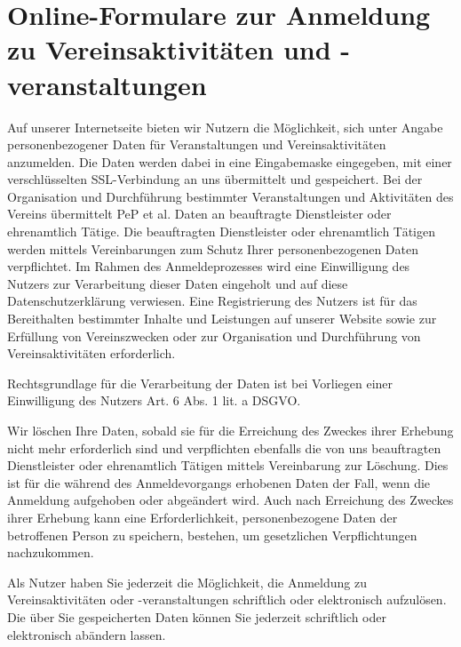 \documentclass[
  fontsize=12pt,
  paper=a4,
  DIV14,
  parskip,
]{scrartcl}
\begin{document}
\section{Online-Formulare zur Anmeldung zu Vereinsaktivitäten und -veranstaltungen}

Auf unserer Internetseite bieten wir Nutzern die Möglichkeit, sich unter
Angabe personenbezogener Daten für Veranstaltungen und Vereinsaktivitäten
anzumelden.
Die Daten werden dabei in eine Eingabemaske eingegeben, mit einer
verschlüsselten SSL-Verbindung an uns übermittelt und gespeichert.
Bei der Organisation und Durchführung bestimmter Veranstaltungen und
Aktivitäten des Vereins übermittelt PeP et al. Daten an beauftragte
Dienstleister oder ehrenamtlich Tätige.
Die beauftragten Dienstleister oder ehrenamtlich Tätigen werden mittels
Vereinbarungen zum Schutz Ihrer personenbezogenen Daten verpflichtet.
Im Rahmen des Anmeldeprozesses wird eine Einwilligung des Nutzers zur
Verarbeitung dieser Daten eingeholt und auf diese Datenschutzerklärung
verwiesen.
Eine Registrierung des Nutzers ist für das Bereithalten bestimmter Inhalte
und Leistungen auf unserer Website sowie zur Erfüllung von Vereinszwecken
oder zur Organisation und Durchführung von Vereinsaktivitäten erforderlich.

Rechtsgrundlage für die Verarbeitung der Daten ist bei Vorliegen einer
Einwilligung des Nutzers Art. 6 Abs. 1 lit. a DSGVO.

Wir löschen Ihre Daten, sobald sie für die Erreichung des Zweckes ihrer
Erhebung nicht mehr erforderlich sind und verpflichten ebenfalls die von uns
beauftragten Dienstleister oder ehrenamtlich Tätigen mittels Vereinbarung zur
Löschung.
Dies ist für die während des Anmeldevorgangs erhobenen Daten der Fall, wenn
die Anmeldung aufgehoben oder abgeändert wird. Auch nach Erreichung des
Zweckes ihrer Erhebung kann eine Erforderlichkeit, personenbezogene Daten der
betroffenen Person zu speichern, bestehen, um gesetzlichen Verpflichtungen
nachzukommen.

Als Nutzer haben Sie jederzeit die Möglichkeit, die Anmeldung zu
Vereinsaktivitäten oder -veranstaltungen schriftlich oder elektronisch
aufzulösen. Die über Sie gespeicherten Daten können Sie jederzeit schriftlich
oder elektronisch abändern lassen.
\end{document}
